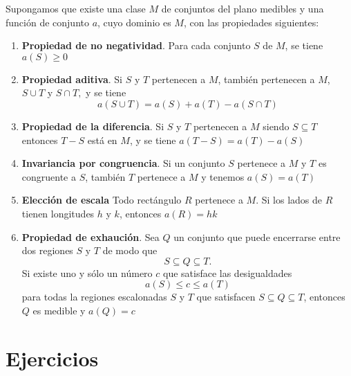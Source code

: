    \begin{tcolorbox}[colframe=white]
	\begin{axioma}
	    Supongamos que existe una clase $M$ de conjuntos del plano medibles y una función de conjunto $a$, cuyo dominio es $M$, con las propiedades siguientes:
	    \begin{enumerate}[\bfseries 1.]
		\item \textbf{Propiedad de no negatividad}. Para cada conjunto $S$ de $M$, se tiene $a(S)\geq 0$
		\item \textbf{Propiedad aditiva}. Si $S$ y $T$ pertenecen a $M$, también pertenecen a $M$, $S \cup T$ y $S \cap T,$ y se tiene $$a(S \cup T)=a(S)+a(T)-a(S\cap T)$$
		\item \textbf{Propiedad de la diferencia}. Si $S$ y $T$ pertenecen a $M$ siendo $S \subseteq T$ entonces $T - S$ está en $M$, y se tiene $a(T-S)=a(T)-a(S)$ 
		\item \textbf{Invariancia por congruencia}. Si un conjunto $S$ pertenece a $M$ y $T$ es congruente a $S$, también $T$ pertenece a $M$ y tenemos $a(S)=a(T)$
		\item \textbf{Elección de escala} Todo rectángulo $R$ pertenece a $M$. Si los lados de $R$ tienen longitudes $h$ y $k$, entonces $a(R)=hk$
		\item \textbf{Propiedad de exhaución}. Sea $Q$ un conjunto que puede encerrarse entre dos regiones $S$ y $T$ de modo que $$S\subseteq Q \subseteq T.$$ Si existe uno y sólo un número $c$ que satisface las desigualdades $$a(S)\leq c \leq a(T)$$ para todas la regiones escalonadas $S$ y $T$ que satisfacen $S\subseteq Q \subseteq T$, entonces $Q$ es medible y $a(Q)=c$

	    \end{enumerate}

	\end{axioma}
    \end{tcolorbox}
    

\setcounter{section}{6}
\section{Ejercicios}

